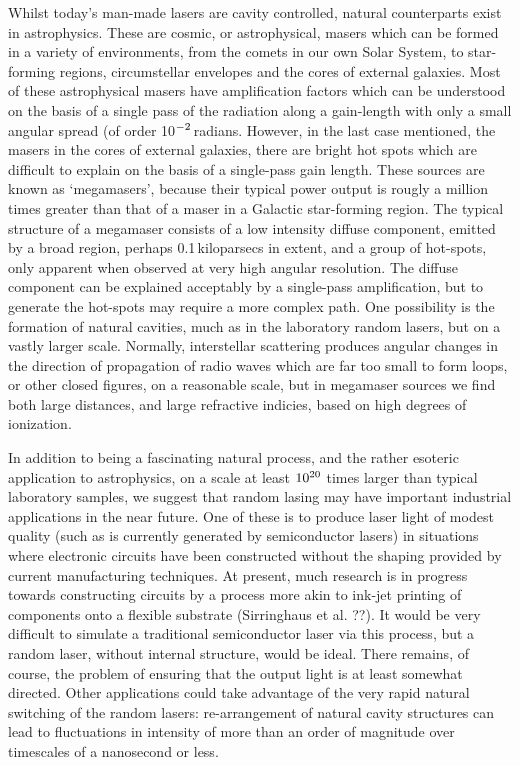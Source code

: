 Whilst today's man-made lasers are cavity controlled, natural counterparts
exist in astrophysics. These are cosmic, or astrophysical, masers which can
be formed in a variety of environments, from the comets in our own Solar
System, to star-forming regions, circumstellar envelopes and the cores of
external galaxies. Most of these astrophysical masers have amplification
factors which can be understood on the basis of a single pass of the
radiation along a gain-length with only a small angular spread (of order
10$^{\rm -2}$\,radians. However, in the last case mentioned, the masers in
the cores of external galaxies, there are bright hot spots which are
difficult to explain on the basis of a single-pass gain length. These sources
are known as `megamasers', because their typical power output is rougly a
million times greater than that of a maser in a Galactic star-forming region.
The typical structure of a megamaser consists of a low intensity diffuse
component, emitted by a broad region, perhaps 0.1\,kiloparsecs in extent,
and a group of hot-spots, only apparent when
observed at very high angular resolution. The diffuse component can be
explained acceptably by a single-pass amplification, but to generate the
hot-spots may require a more complex path. One possibility is the formation
of natural cavities, much as in the laboratory random lasers, but on a
vastly larger scale. Normally, interstellar scattering produces angular
changes in the direction of propagation of radio waves which are far too
small to form loops, or other closed figures, on a reasonable scale, but in
megamaser sources we find both large distances, and large refractive indicies,
based on high degrees of ionization.

In addition to being a fascinating natural process, and the rather esoteric
application to astrophysics, on a scale at least $10^{\rm 20}$ times larger
than typical laboratory samples, we suggest that random lasing may have
important industrial applications in the near future. One of these is to
produce laser light of modest quality (such as is currently generated by
semiconductor lasers) in situations where electronic circuits have been
constructed without the shaping provided by current manufacturing
techniques. At present, much research is in progress towards constructing
circuits by a process more akin to ink-jet printing of components onto a
flexible substrate (Sirringhaus et al. ??). It would be very difficult to
simulate a traditional semiconductor laser via this process, but a random
laser, without internal structure, would be ideal. There remains, of course,
the problem of ensuring that the output light is at least somewhat directed.
Other applications could take advantage of the very rapid natural switching
of the random lasers: re-arrangement of natural cavity structures can lead
to fluctuations in intensity of more than an order of magnitude over 
timescales of a nanosecond or less.

